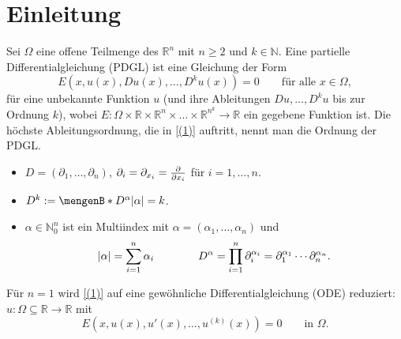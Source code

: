 
\section{Einleitung} 
\label{sec:einleitung}
\begin{definition}[PDGL]
	Sei $\Omega$ eine offene Teilmenge des $\mathbb{R}^n$ mit $n \geq 2$ und $ k \in \mathbb{N}$. 
	Eine partielle Differentialgleichung (PDGL) ist eine Gleichung der Form
	\begin{equation}\label{(1)}
		E(x,u(x),Du(x),\dots,D^ku(x))=0 \qquad \text{für alle }x \in \Omega,
	\end{equation}
	für eine unbekannte Funktion $u$ (und ihre Ableitungen $Du,\dots,D^ku$ bis zur Ordnung $k$), wobei $E: \Omega \times \mathbb{R} \times \mathbb{R}^n \times \dots \times \mathbb{R}^{n^k} \to \mathbb{R}$ ein gegebene Funktion ist. 
	Die höchste Ableitungsordnung, die in \eqref{(1)} auftritt, nennt man die Ordnung der PDGL.
\end{definition}

\begin{notation}
\begin{itemize}
	\item $D = (\partial_1, \dots , \partial_n)$, $\partial_i = \partial_{x_i} = \frac{{\partial }}{{\partial x_i}} $ für $i=1,\dots,n$.
	\item $D^k:= \set[D^{\alpha }]{\abs{\alpha }=k}$.
	\item $\alpha \in \mathbb{N}_0^n$ ist ein Multiindex mit $\alpha = (\alpha_1, \dots, \alpha_n)$ und
	\[
		\lvert\alpha\rvert = \sum^{n}_{i=1}\alpha_i \qquad \qquad D^{\alpha}= \prod\limits_{i=1}^{n}\partial_i^{\alpha_i} 
		= \partial_1^{\alpha_1} \cdots \partial_n^{\alpha_n}.
	\]
\end{itemize}
\end{notation}

\begin{bemerkung}
Für $n=1$ wird \eqref{(1)} auf eine gewöhnliche Differentialgleichung (ODE) reduziert: $u: \Omega \subseteq \mathbb{R} \to \mathbb{R}$ mit
\[
	E(x,u(x),u'(x),\dots,u^{(k)}(x))=0 \qquad \text{in } \Omega.
\]
\end{bemerkung}

